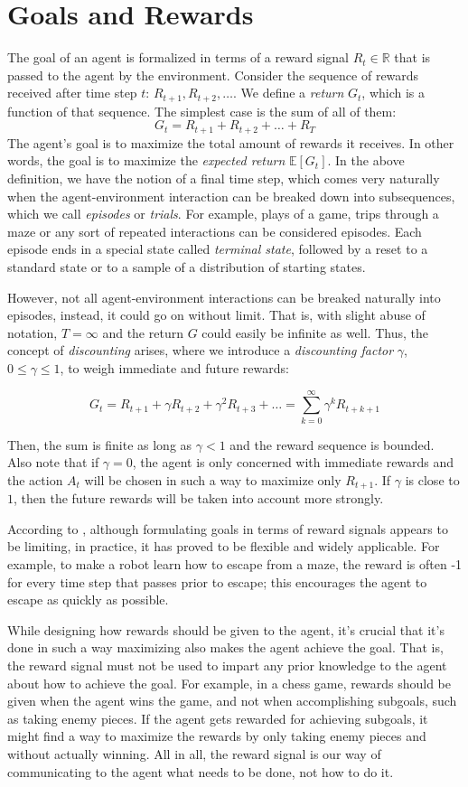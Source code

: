 \section{Goals and Rewards}
The goal of an agent is formalized in terms of a reward signal $R_t \in \mathbb{R}$ that is passed to the agent by the environment. Consider the sequence of rewards received after time step $t$: $R_{t+1}, R_{t+2}, \dots$. We define a \textit{return} $G_t$, which is a function of that sequence. The simplest case is the sum of all of them:
\[
    G_t = R_{t+1} + R_{t+2} + \dots + R_T
\]
The agent's goal is to maximize the total amount of rewards it receives. In other words, the goal is to maximize the \textit{expected return} $\mathbb{E}[G_t]$. In the above definition, we have the notion of a final time step, which comes very naturally when the agent-environment interaction can be breaked down into subsequences, which we call \textit{episodes} or \textit{trials}. For example, plays of a game, trips through a maze or any sort of repeated interactions can be considered episodes. Each episode ends in a special state called \textit{terminal state}, followed by a reset to a standard state or to a sample of a distribution of starting states.

However, not all agent-environment interactions can be breaked naturally into episodes, instead, it could go on without limit. That is, with slight abuse of notation, $T = \infty$ and the return $G$ could easily be infinite as well. Thus, the concept of \textit{discounting} arises, where we introduce a \textit{discounting factor} $\gamma$, $0 \leq \gamma \leq 1$, to weigh immediate and future rewards:

\[
    G_t = R_{t+1} + \gamma R_{t+2} + \gamma^2 R_{t+3} + \dots = \sum_{k=0}^{\infty}\gamma^k R_{t+k+1}
\]

Then, the sum is finite as long as $\gamma < 1$ and the reward sequence is bounded. Also note that if $\gamma = 0$, the agent is only concerned with immediate rewards and the action $A_t$ will be chosen in such a way to maximize only $R_{t+1}$. If $\gamma$ is close to $1$, then the future rewards will be taken into account more strongly.

According to \cite{suttonbarto}, although formulating goals in terms of reward signals appears to be limiting, in practice, it has proved to be flexible and widely applicable. For example, to make a robot learn how to escape from a maze, the reward is often -1 for every time
step that passes prior to escape; this encourages the agent to escape as quickly as possible.

While designing how rewards should be given to the agent, it's crucial that it's done in such a way maximizing also makes the agent achieve the goal. That is, the reward signal must not be used to impart any prior knowledge to the agent about how to achieve the goal. For example, in a chess game, rewards should be given when the agent wins the game, and not when accomplishing subgoals, such as taking enemy pieces. If the agent gets rewarded for achieving subgoals, it might find a way to maximize the rewards by only taking enemy pieces and without actually winning. All in all, the reward signal is our way of communicating to the agent what needs to be done, not how to do it. 